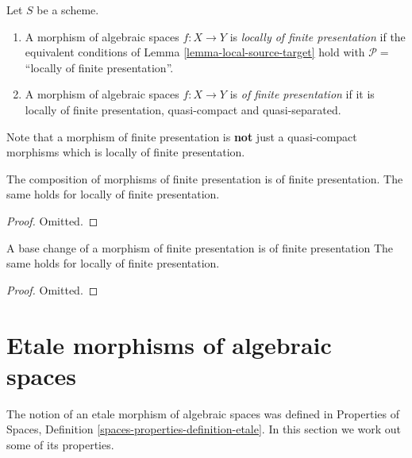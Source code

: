 \begin{definition}
\label{definition-locally-finite-presentation}
Let $S$ be a scheme.
\begin{enumerate}
\item A morphism of algebraic spaces $f : X \to Y$ is
{\it locally of finite presentation} if the equivalent conditions of
Lemma \ref{lemma-local-source-target} hold with
$\mathcal{P} =$``locally of finite presentation''.
\item A morphism of  algebraic spaces $f : X \to Y$ is
{\it of finite presentation}
if it is locally of finite presentation, quasi-compact and
quasi-separated.
\end{enumerate}
\end{definition}

\noindent
Note that a morphism of finite presentation is {\bf not} just a quasi-compact
morphisms which is locally of finite presentation.

\begin{lemma}
\label{lemma-composition-finite-presentation}
The composition of morphisms of finite presentation is of finite presentation.
The same holds for locally of finite presentation.
\end{lemma}

\begin{proof}
Omitted.
\end{proof}

\begin{lemma}
\label{lemma-base-change-finite-presentation}
A base change of a morphism of finite presentation is of finite presentation
The same holds for locally of finite presentation.
\end{lemma}

\begin{proof}
Omitted.
\end{proof}











\section{Etale morphisms of algebraic spaces}
\label{section-etale}

\noindent
The notion of an etale morphism of algebraic spaces was defined in
Properties of Spaces, Definition \ref{spaces-properties-definition-etale}.
In this section we work out some of its properties.

